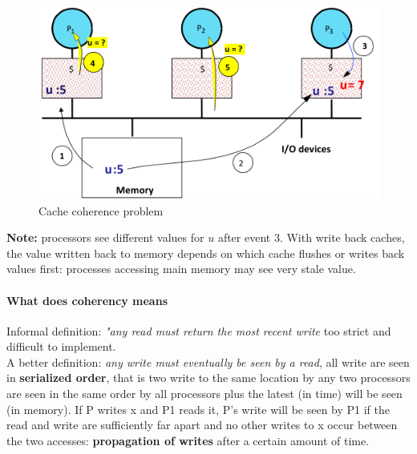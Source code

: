 \begin{figure}[h]
    \centering
    \includegraphics[scale = 0.4]{images/cache-coherence-problem}
    \caption{Cache coherence problem}
    \label{fig:cache-coherence-problem}
\end{figure}
\textbf{Note:} processors see different values for $u$ after event 3.
With write back caches, the value written back to memory depends on which cache flushes or writes back values first:
processes accessing main memory may see very stale value.

\paragraph{What does coherency means}
Informal definition: \textit{"any read must return the most recent write} \textrightarrow too strict and difficult to
implement.\\
A better definition: \textit{any write must eventually be seen by a read}, all write are seen in \textbf{serialized
order}, that is two write to the same location by any two processors are seen in the same order by all processors
plus the latest (in time) will be seen (in memory).
If P writes x and P1 reads it, P’s write will be seen by P1 if the read
and write are sufficiently far apart and no other writes to x occur
between the two accesses: \textbf{propagation of writes} after a certain amount of time.

